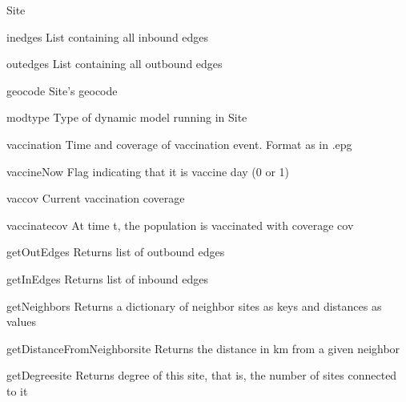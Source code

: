 \documentclass[a4paper,10pt]{manual}
\begin{document}
\begin{classdesc}{Site}{}
\hypertarget{Site.inedges}{}\begin{memberdesc}{inedges}
List containing all inbound edges
\end{memberdesc}


\hypertarget{Site.outedges}{}\begin{memberdesc}{outedges}
List containing all outbound edges
\end{memberdesc}


\hypertarget{Site.geocode}{}\begin{memberdesc}{geocode}
Site's geocode
\end{memberdesc}


\hypertarget{Site.modtype}{}\begin{memberdesc}{modtype}
Type of dynamic model running in Site
\end{memberdesc}


\hypertarget{Site.vaccination}{}\begin{memberdesc}{vaccination}
Time and coverage of vaccination event. Format as in .epg
\end{memberdesc}


\hypertarget{Site.vaccineNow}{}\begin{memberdesc}{vaccineNow}
Flag indicating that it is vaccine day (0 or 1)
\end{memberdesc}


\hypertarget{Site.vaccov}{}\begin{memberdesc}{vaccov}
Current vaccination coverage
\end{memberdesc}


\hypertarget{Site.vaccinate}{}\begin{methoddesc}{vaccinate}{cov}
At time t, the population is vaccinated with coverage cov
\end{methoddesc}


\hypertarget{Site.getOutEdges}{}\begin{methoddesc}{getOutEdges}{}
Returns list of outbound edges
\end{methoddesc}


\hypertarget{Site.getInEdges}{}\begin{methoddesc}{getInEdges}{}
Returns list of inbound edges
\end{methoddesc}


\hypertarget{Site.getNeighbors}{}\begin{methoddesc}{getNeighbors}{}
Returns a dictionary of neighbor sites as keys and distances as values
\end{methoddesc}


\hypertarget{Site.getDistanceFromNeighbor}{}\begin{methoddesc}{getDistanceFromNeighbor}{site}
Returns the distance in km from a given neighbor
\end{methoddesc}


\hypertarget{Site.getDegree}{}\begin{methoddesc}{getDegree}{site}
Returns degree of this site, that is, the number of sites connected to it
\end{methoddesc}
\end{classdesc}
\end{document}
